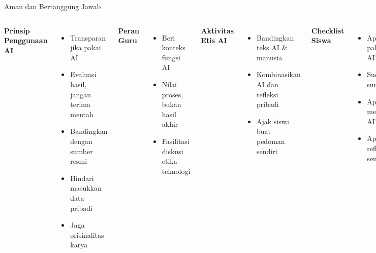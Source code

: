 \documentclass[aspectratio=169, table]{beamer}
\begin{document}
	
	\begin{frame}[fragile]{Aman dan Bertanggung Jawab}
		\vspace{15pt}
		\begin{columns}[T]
			\textbf{Prinsip Penggunaan AI}
			\begin{itemize}
				\item Transparan jika pakai AI
				\item Evaluasi hasil, jangan terima mentah
				\item Bandingkan dengan sumber resmi
				\item Hindari masukkan data pribadi
				\item Jaga orisinalitas karya
			\end{itemize}
			
			\textbf{Peran Guru}
			\begin{itemize}
				\item Beri konteks fungsi AI
				\item Nilai proses, bukan hasil akhir
				\item Fasilitasi diskusi etika teknologi
			\end{itemize}
			
			\textbf{Aktivitas Etis AI}
			\begin{itemize}
				\item Bandingkan teks AI \& manusia
				\item Kombinasikan AI dan refleksi pribadi
				\item Ajak siswa buat pedoman sendiri
			\end{itemize}
			
			\textbf{Checklist Siswa}
			\begin{itemize}
				\item Apakah saya paham hasil AI?
				\item Sudah cek sumber lain?
				\item Apakah saya menyebutkan AI?
				\item Apakah saya refleksi sendiri?
			\end{itemize}
		\end{columns}
	\end{frame}
	
\end{document}
